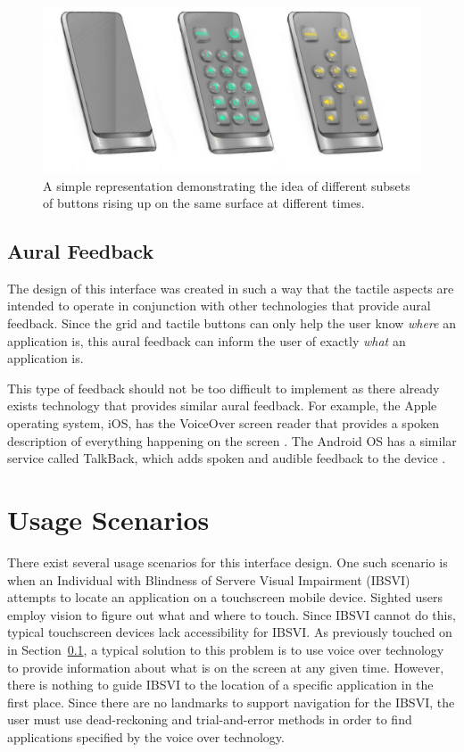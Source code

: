 \documentclass[11pt]{article}
\begin{document}
\begin{figure}[ht]
\centering
\includegraphics[width=6in]{buttons.png}
\caption{A simple representation demonstrating the idea of different subsets of buttons rising up on the same surface at different times.}
\label{buttons}
\end{figure}

\subsection{Aural Feedback}
\label{aural-feedback}
The design of this interface was created in such a way that the tactile aspects are intended to operate in conjunction with other technologies that provide aural feedback. Since the grid and tactile buttons can only help the user know \textit{where} an application is, this aural feedback can inform the user of exactly \textit{what} an application is.

This type of feedback should not be too difficult to implement as there already exists technology that provides similar aural feedback. For example, the Apple operating system, iOS, has the VoiceOver screen reader that provides a spoken description of everything happening on the screen \cite{VoiceOver}. The Android OS has a similar service called TalkBack, which adds spoken and audible feedback to the device \cite{TalkBack}.


\section{Usage Scenarios}
There exist several usage scenarios for this interface design. One such scenario is when an Individual with Blindness of Servere Visual Impairment (IBSVI) attempts to locate an application on a touchscreen mobile device. Sighted users employ vision to figure out what and where to touch. Since IBSVI cannot do this, typical touchscreen devices lack accessibility for IBSVI. As previously touched on in Section~\ref{aural-feedback}, a typical solution to this problem is to use voice over technology to provide information about what is on the screen at any given time. However, there is nothing to guide IBSVI to the location of a specific application in the first place. Since there are no landmarks to support navigation for the IBSVI, the user must use dead-reckoning and trial-and-error methods in order to find applications specified by the voice over technology. 
\end{document}
